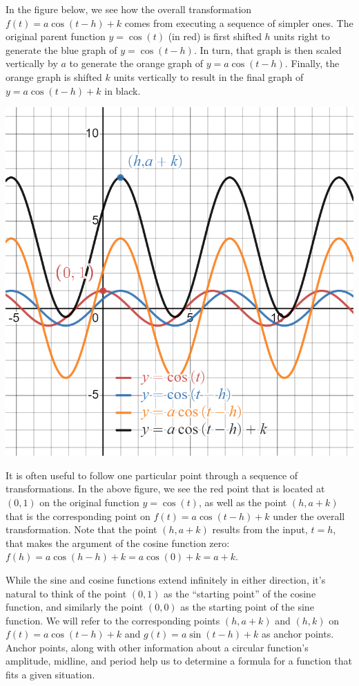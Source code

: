 \documentclass{ximera}
\begin{document}
In the figure below, we see how the overall transformation \(f(t) = a\cos(t-h)+k\) comes from executing a sequence of simpler ones.  The original parent function \(y = \cos(t)\) (in red) is first shifted \(h\) units right to generate the blue graph of \(y = \cos(t - h)\).  In turn, that graph is then scaled vertically by \(a\) to generate the orange graph of \(y = a\cos(t-h)\).  Finally, the orange graph is shifted \(k\) units vertically to result in the final graph of \(y = a\cos(t-h) + k\) in black.%
\begin{image}
\includegraphics[width=0.8\linewidth]{images/sinusoidal-transformed-cosine-2.png}
\end{image}
It is often useful to follow one particular point through a sequence of transformations.  In the above figure, we see the red point that is located at \((0,1)\) on the original function \(y = \cos(t)\), as well as the point \((h, a+k)\) that is the corresponding point on \(f(t) = a\cos(t-h) + k\) under the overall transformation.  Note that the point \((h,a+k)\) results from the input, \(t = h\), that makes the argument of the cosine function zero:  \(f(h) = a\cos(h - h) + k = a\cos(0) + k = a + k\).%

While the sine and cosine functions extend infinitely in either direction, it's natural to think of the point \((0,1)\) as the ``starting point'' of the cosine function, and similarly the point \((0,0)\) as the starting point of the sine function.  We will refer to the corresponding points \((h,a+k)\) and \((h,k)\) on \(f(t) = a\cos(t-h) + k\) and \(g(t) = a\sin(t-h) + k\) as anchor points. Anchor points, along with other information about a circular function's amplitude, midline, and period help us to determine a formula for a function that fits a given situation.%
\end{document}
